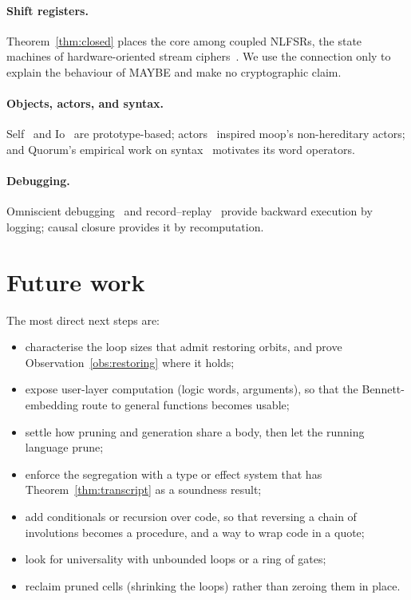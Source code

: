 \documentclass[11pt]{article}
\theoremstyle{definition}
\theoremstyle{remark}
\newcommand{\moop}{\textsf{moop}}
\begin{document}
\paragraph{Shift registers.}
Theorem~\ref{thm:closed} places the core among coupled NLFSRs, the state
machines of hardware-oriented stream ciphers~\cite{decanniere2008,
hell2007,golomb1967}. We use the connection only to explain the
behaviour of MAYBE and make no cryptographic claim.

\paragraph{Objects, actors, and syntax.}
Self~\cite{ungar1987} and Io~\cite{dekorte2005} are prototype-based;
actors~\cite{hewitt1973} inspired \moop{}'s non-hereditary actors; and
Quorum's empirical work on syntax~\cite{stefik2013} motivates its word
operators.

\paragraph{Debugging.}
Omniscient debugging~\cite{lewis2003} and record--replay~\cite{
ocallahan2017} provide backward execution by logging; causal closure
provides it by recomputation.

\section{Future work}
\label{sec:future}

The most direct next steps are:
\begin{itemize}[nosep]
\item characterise the loop sizes that admit restoring orbits, and prove
  Observation~\ref{obs:restoring} where it holds;
\item expose user-layer computation (logic words, arguments), so that
  the Bennett-embedding route to general functions becomes usable;
\item settle how pruning and generation share a body, then let the
  running language prune;
\item enforce the segregation with a type or effect system that has
  Theorem~\ref{thm:transcript} as a soundness result;
\item add conditionals or recursion over code, so that reversing a
  chain of involutions becomes a procedure, and a way to wrap code in a
  quote;
\item look for universality with unbounded loops or a ring of gates;
\item reclaim pruned cells (shrinking the loops) rather than zeroing
  them in place.
\end{itemize}
\end{document}
